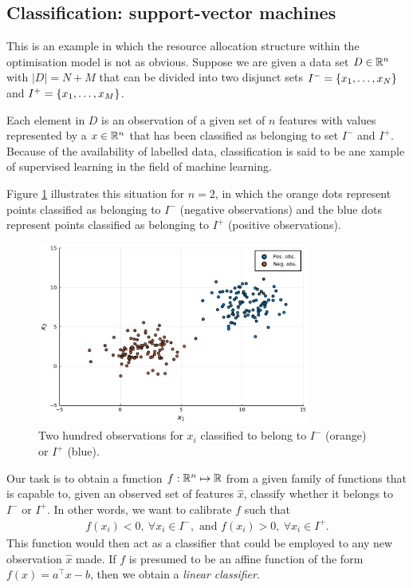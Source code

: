 \subsection{Classification: support-vector machines}

This is an example in which the resource allocation structure within the optimisation model is not as obvious. Suppose we are given a data set $D \in \mathbb{R}^{n}$ with $|D| = N + M$ that can be divided into two disjunct sets $I^- = \left\{ x_1, \dots, x_N \right \}$ and $I^+ = \left\{ x_1,\dots, x_M \right \}$. 

Each element in $D$ is an observation of a given set of $n$ features with values represented by a $x \in \mathbb{R}^n$ that has been classified as belonging to set $I^-$ and $I^+$. Because of the availability of labelled data, classification is said to be ane xample of supervised learning in the field of machine learning. 

Figure \ref{fig:classified_observations} illustrates this situation for $n = 2$, in which the orange dots represent points classified as belonging to $I^-$ (negative observations) and the blue dots represent points classified as belonging to $I^+$ (positive observations).

\begin{figure}
    \includegraphics[width=0.8\textwidth]{figures/part_2_chapter_1/classes_no_classifier.pdf}
    \caption{Two hundred observations for $x_i$ classified to belong to $I^-$ (orange) or $I^+$ (blue).}        
    \label{fig:classified_observations}
\end{figure}

Our task is to obtain a function $f:\mathbb{R}^n \mapsto \mathbb{R}$ from a given family of functions that is capable to, given an observed set of features $\hat{x}$, classify whether it belongs to $I^-$ or $I^+$. In other words, we want to calibrate $f$ such that
%
\begin{align}
	f(x_i) < 0, \ \forall x_i \in I^-, \text{ and } f(x_i) > 0, \ \forall x_i \in I^+.  
\end{align}
%
This function would then act as a classifier that could be employed to any new observation $\hat{x}$ made. If $f$ is presumed to be an affine function of the form $f(x) = a^\top x - b$, then we obtain a \emph{linear classifier}. 

